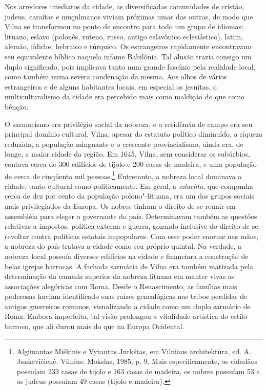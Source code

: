 Nos arredores imediatos da cidade, as diversificadas comunidades de
cristão, judeus, caraítas e muçulmanos viviam próximas umas das outras,
de modo que Vilna se transformou no ponto de encontro para todo um grupo
de idiomas: lituano, eslavo (polonês, ruteno, russo, antigo eslavônico
eclesiástico), latim, alemão, iídiche, hebraico e túrquico. Os
estrangeiros rapidamente encontravam seu equivalente bíblico naquela
infame Babilônia. Tal alusão trazia consigo um duplo significado, pois
implicava tanto num grande fascínio pela realidade local, como também
numa severa condenação da mesma. Aos olhos de vários estrangeiros e de
alguns habitantes locais, em especial os jesuítas, o multiculturalismo
da cidade era percebido mais como maldição do que como bênção.

O sarmacismo era privilégio social da nobreza, e a residência de campo
era seu principal domínio cultural. Vilna, apesar do estatuto político
diminuído, a riqueza reduzida, a população minguante e o crescente
provincialismo, ainda era, de longe, a maior cidade da região. Em 1645,
Vilna, sem considerar os subúrbios, contava cerca de 300 edifícios de
tijolo e 200 casas de madeira, e uma população de cerca de cinqüenta mil
pessoas.\footnote{Algimantas Miškinis e Vytautas Jurkštas, em Vilniaus
  architektūra, ed. A. Jankevičienė. Vilnius: Mokslas, 1985, p. 9. Mais
  especificamente, os cidadãos possuíam 233 casas de tijolo e 163 casas
  de madeira, os nobres possuíam 53 e os judeus possuíam 49 casas
  (tijolo e madeira).} Entretanto, a nobreza local dominava a cidade,
tanto cultural como politicamente. Em geral, a \emph{szlachta}, que
compunha cerca de dez por cento da população polono"-lituana, era um dos
grupos sociais mais privilegiados da Europa. Os nobres tinham o direito
de se reunir em assembléia para eleger o governante do país.
Determinavam também as questões relativas a impostos, política externa e
guerra, gozando inclusive do direito de se revoltar contra políticas
estatais impopulares. Com esse poder enorme nas mãos, a nobreza do país
tratava a cidade como seu próprio quintal. Na verdade, a nobreza local
possuía diversos edifícios na cidade e financiara a construção de belas
igrejas barrocas. A fachada sarmácia de Vilna era também matizada pela
determinação da camada superior da nobreza lituana em manter vivas as
associações alegóricas com Roma. Desde o Renascimento, as famílias mais
poderosas haviam identificado suas raízes genealógicas nas tribos
perdidas de antigos guerreiros romanos, visualizando a cidade como um
duplo sarmácio de Roma. Embora imperfeita, tal visão prolongou a
vitalidade artística do estilo barroco, que ali durou mais do que na
Europa Ocidental.

